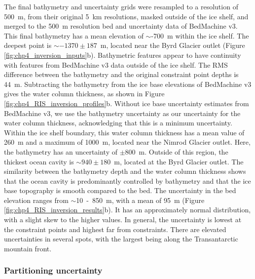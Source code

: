 The final bathymetry and uncertainty grids were resampled to a resolution of 500~m, from their original 5~km resolutions, masked outside of the ice shelf, and merged to the 500~m resolution bed and uncertainty data of BedMachine v3. This final bathymetry has a mean elevation of $\sim$-700~m within the ice shelf. The deepest point is $\sim-1370\pm187$~m, located near the Byrd Glacier outlet (Figure \ref{fig:chp4_inversion_inputs}b). Bathymetric features appear to have continuity with features from BedMachine v3 data outside of the ice shelf. The RMS difference between the bathymetry and the original constraint point depths is 44~m. Subtracting the bathymetry from the ice base elevations of BedMachine v3 \citep{morlighemdeep2020, morlighemmeasures2022} gives the water column thickness, as shown in Figure \ref{fig:chp4_RIS_inversion_profiles}b. Without ice base uncertainty estimates from BedMachine v3, we use the bathymetry uncertainty as our uncertainty for the water column thickness, acknowledging that this is a minimum uncertainty. Within the ice shelf boundary, this water column thickness has a mean value of 260~m and a maximum of 1000~m, located near the Nimrod Glacier outlet. Here, the bathymetry has an uncertainty of $\pm$800~m. Outside of this region, the thickest ocean cavity is $\sim940\pm180$~m, located at the Byrd Glacier outlet. The similarity between the bathymetry depth and the water column thickness shows that the ocean cavity is predominantly controlled by bathymetry and that the ice base topography is smooth compared to the bed. The uncertainty in the bed elevation ranges from $\sim$10~-~850~m, with a mean of 95~m (Figure \ref{fig:chp4_RIS_inversion_results}b). It has an approximately normal distribution, with a slight skew to the higher values. In general, the uncertainty is lowest at the constraint points and highest far from constraints. There are elevated uncertainties in several spots, with the largest being along the Transantarctic mountain front.\\

\subsubsection{Partitioning uncertainty}

